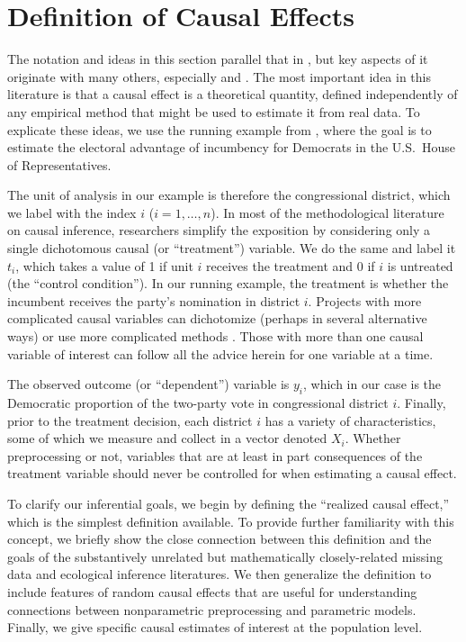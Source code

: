 \documentclass[11pt,titlepage]{article}
\begin{document}
\section{Definition of Causal Effects}

The notation and ideas in this section parallel that in
\citet[][Section 3.1.1]{KinKeoVer94}, but key aspects of it originate
with many others, especially \citet{Rubin74} and \citet{Holland86}.
The most important idea in this literature is that a causal effect is
a theoretical quantity, defined independently of any empirical method
that might be used to estimate it from real data.  To explicate these
ideas, we use the running example from \citet[][Section
3.1.1]{KinKeoVer94}, where the goal is to estimate the electoral
advantage of incumbency for Democrats in the U.S.\ House of
Representatives.

The unit of analysis in our example is therefore the congressional
district, which we label with the index $i$ ($i=1,\dots,n$).  In most
of the methodological literature on causal inference, researchers
simplify the exposition by considering only a single dichotomous
causal (or ``treatment'') variable.  We do the same and label it
$t_i$, which takes a value of 1 if unit $i$ receives the treatment and
0 if $i$ is untreated (the ``control condition'').  In our running
example, the treatment is whether the incumbent receives the party's
nomination in district $i$.  Projects with more complicated causal
variables can dichotomize (perhaps in several alternative ways) or use
more complicated methods \citep{ImaDyk03}.  Those with more than one
causal variable of interest can follow all the advice herein for one
variable at a time.

The observed outcome (or ``dependent'') variable is $y_i$, which in
our case is the Democratic proportion of the two-party vote in
congressional district $i$.  Finally, prior to the treatment decision,
each district $i$ has a variety of characteristics, some of which we
measure and collect in a vector denoted $X_i$.  Whether preprocessing
or not, variables that are at least in part consequences of the
treatment variable should never be controlled for when estimating a
causal effect.

To clarify our inferential goals, we begin by defining the ``realized
causal effect,'' which is the simplest definition available.  To
provide further familiarity with this concept, we briefly show the
close connection between this definition and the goals of the
substantively unrelated but mathematically closely-related missing
data and ecological inference literatures.  We then generalize the
definition to include features of random causal effects that are
useful for understanding connections between nonparametric
preprocessing and parametric models.  Finally, we give specific causal
estimates of interest at the population level.
\end{document}
